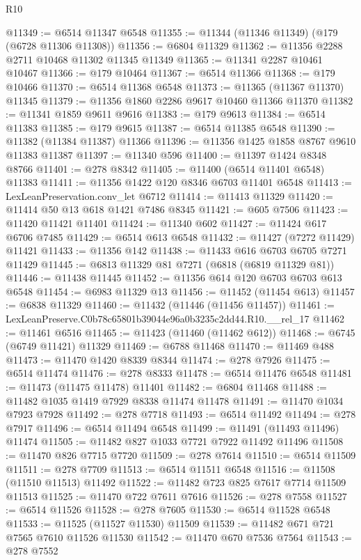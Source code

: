 \begin{lexlean}{R10}
\begin{coremodule}
@11349 := @6514 @11347 @6548
@11355 := @11344 (@11346 @11349) (@179 (@6728 @11306 @11308))
@11356 := @6804 @11329
@11362 := @11356 @2288 @2711 @10468 @11302 @11345 @11349
@11365 := @11341 @2287 @10461 @10467
@11366 := @179 @10464
@11367 := @6514 @11366
@11368 := @179 @10466
@11370 := @6514 @11368 @6548
@11373 := @11365 (@11367 @11370) @11345
@11379 := @11356 @1860 @2286 @9617 @10460 @11366 @11370
@11382 := @11341 @1859 @9611 @9616
@11383 := @179 @9613
@11384 := @6514 @11383
@11385 := @179 @9615
@11387 := @6514 @11385 @6548
@11390 := @11382 (@11384 @11387) @11366
@11396 := @11356 @1425 @1858 @8767 @9610 @11383 @11387
@11397 := @11340 @596
@11400 := @11397 @1424 @8348 @8766
@11401 := @278 @8342
@11405 := @11400 (@6514 @11401 @6548) @11383
@11411 := @11356 @1422 @120 @8346 @6703 @11401 @6548
@11413 := LexLeanPreservation.conv_let @6712
@11414 := @11413 @11329
@11420 := @11414 @50 @13 @618 @1421 @7486 @8345
@11421 := @605 @7506
@11423 := @11420 @11421 @11401
@11424 := @11340 @602
@11427 := @11424 @617 @6706 @7485
@11429 := @6514 @613 @6548
@11432 := @11427 (@7272 @11429) @11421
@11433 := @11356 @142
@11438 := @11433 @616 @6703 @6705 @7271 @11429
@11445 := @6813 @11329 @81 @7271 (@6818 (@6819 @11329 @81))
@11446 := @11438 @11445
@11452 := @11356 @614 @120 @6703 @6703 @613 @6548
@11454 := @6983 @11329 @13
@11456 := @11452 (@11454 @613)
@11457 := @6838 @11329
@11460 := @11432 (@11446 (@11456 @11457))
@11461 := LexLeanPreserve.C0b78c65801b39044e96a0b3235c2dd44.R10.__rel_17
@11462 := @11461 @6516
@11465 := @11423 (@11460 (@11462 @612))
@11468 := @6745 (@6749 @11421) @11329
@11469 := @6788 @11468
@11470 := @11469 @488
@11473 := @11470 @1420 @8339 @8344
@11474 := @278 @7926
@11475 := @6514 @11474
@11476 := @278 @8333
@11478 := @6514 @11476 @6548
@11481 := @11473 (@11475 @11478) @11401
@11482 := @6804 @11468
@11488 := @11482 @1035 @1419 @7929 @8338 @11474 @11478
@11491 := @11470 @1034 @7923 @7928
@11492 := @278 @7718
@11493 := @6514 @11492
@11494 := @278 @7917
@11496 := @6514 @11494 @6548
@11499 := @11491 (@11493 @11496) @11474
@11505 := @11482 @827 @1033 @7721 @7922 @11492 @11496
@11508 := @11470 @826 @7715 @7720
@11509 := @278 @7614
@11510 := @6514 @11509
@11511 := @278 @7709
@11513 := @6514 @11511 @6548
@11516 := @11508 (@11510 @11513) @11492
@11522 := @11482 @723 @825 @7617 @7714 @11509 @11513
@11525 := @11470 @722 @7611 @7616
@11526 := @278 @7558
@11527 := @6514 @11526
@11528 := @278 @7605
@11530 := @6514 @11528 @6548
@11533 := @11525 (@11527 @11530) @11509
@11539 := @11482 @671 @721 @7565 @7610 @11526 @11530
@11542 := @11470 @670 @7536 @7564
@11543 := @278 @7552

\end{coremodule}
\end{lexlean}
